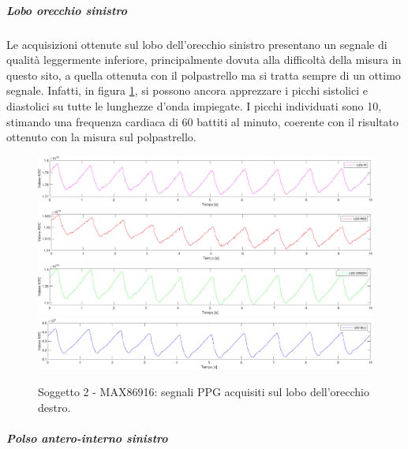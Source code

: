 \subparagraph{Lobo orecchio sinistro}

Le acquisizioni ottenute sul lobo dell'orecchio sinistro presentano un segnale di qualità leggermente inferiore, principalmente dovuta alla difficoltà della misura in questo sito, a quella ottenuta con il polpastrello ma si tratta sempre di un ottimo segnale. Infatti, in figura \ref{fig:soggetto2_MAX86916_lobo}, si possono ancora apprezzare i picchi sistolici e diastolici su tutte le lunghezze d'onda impiegate. I picchi individuati sono 10, stimando una frequenza cardiaca di 60 battiti al minuto, coerente con il risultato ottenuto con la misura sul polpastrello.
\begin{figure}[h]
	\centering
	\includegraphics[width=1\linewidth]{ImageFiles/Misure Preliminari/Soggetto 2/max86916/lobo_ired}
	\includegraphics[width=1\linewidth]{ImageFiles/Misure Preliminari/Soggetto 2/max86916/lobo_red}
	\includegraphics[width=1\linewidth]{ImageFiles/Misure Preliminari/Soggetto 2/max86916/lobo_green}
	\includegraphics[width=1\linewidth]{ImageFiles/Misure Preliminari/Soggetto 2/max86916/lobo_blu}
	\caption{Soggetto 2 - MAX86916: segnali PPG acquisiti sul lobo dell'orecchio destro.}
	\label{fig:soggetto2_MAX86916_lobo}
\end{figure}

\subparagraph{Polso antero-interno sinistro}

